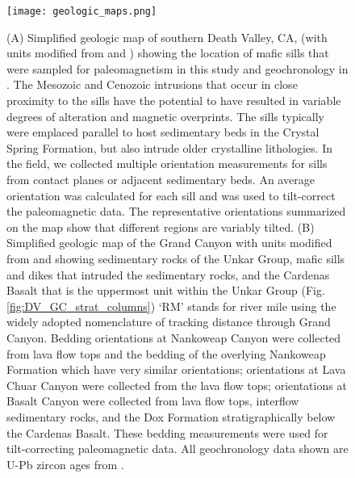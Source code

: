 \documentclass[draft]{agujournal2019}
\begin{document}
\begin{figure}[h!]
\centering
\texttt{[image: geologic\_maps.png]}
\caption{\footnotesize (A) Simplified geologic map of southern Death Valley, CA, (with units modified from  and ) showing the location of mafic sills that were sampled for paleomagnetism in this study and geochronology in . The Mesozoic and Cenozoic intrusions that occur in close proximity to the sills have the potential to have resulted in variable degrees of alteration and magnetic overprints. The sills typically were emplaced parallel to host sedimentary beds in the Crystal Spring Formation, but also intrude older crystalline lithologies. In the field, we collected multiple orientation measurements for sills from contact planes or adjacent sedimentary beds. An average orientation was calculated for each sill and was used to tilt-correct the paleomagnetic data. The representative orientations summarized on the map show that different regions are variably tilted. (B) Simplified geologic map of the Grand Canyon with units modified from  and  showing sedimentary rocks of the Unkar Group, mafic sills and dikes that intruded the sedimentary rocks, and the Cardenas Basalt that is the uppermost unit within the Unkar Group (Fig. \ref{fig:DV_GC_strat_columns}) `RM' stands for river mile using the widely adopted nomenclature of tracking distance through Grand Canyon. Bedding orientations at Nankoweap Canyon were collected from lava flow tops and the bedding of the overlying Nankoweap Formation which have very similar orientations; orientations at Lava Chuar Canyon were collected from the lava flow tops; orientations at Basalt Canyon were collected from lava flow tops, interflow sedimentary rocks, and the Dox Formation stratigraphically below the Cardenas Basalt. These bedding measurements were used for tilt-correcting paleomagnetic data. All geochronology data shown are U-Pb zircon ages from .}
\label{fig:geologic_maps}
\end{figure}
\end{document}
